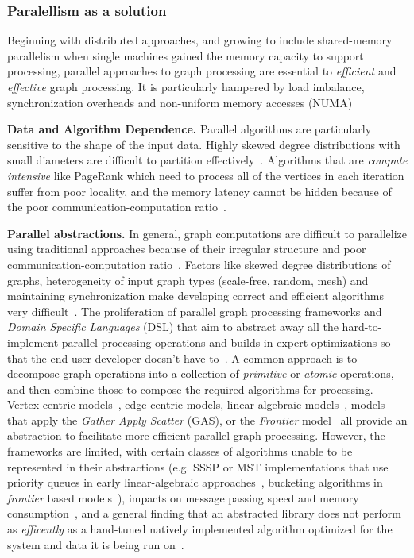 \subsubsection{Paralellism as a solution}
Beginning with distributed approaches, and growing to include shared-memory parallelism when single machines gained the memory capacity to support processing, parallel approaches to graph processing are essential to \textit{efficient} and \textit{effective} graph processing. 
It is particularly hampered by load imbalance, synchronization overheads and non-uniform memory accesses (NUMA)~\cite{Beamer2015}

\textbf{Data and Algorithm Dependence.}
Parallel algorithms are particularly sensitive to the shape of the input data. 
Highly skewed degree distributions with small diameters are difficult to partition effectively~\cite{Beamer2015, Wu2015}.
Algorithms that are \textit{compute intensive} like PageRank which need to process all of the vertices in each iteration suffer from poor locality, and the memory latency cannot be hidden because of the poor communication-computation ratio~\cite{Ahn2015}.  

\textbf{Parallel abstractions.}
In general, graph computations are difficult to parallelize using traditional approaches because of their irregular structure and poor communication-computation ratio~\cite{Buluc2011}.
Factors like skewed degree distributions of graphs, heterogeneity of input graph types (scale-free, random, mesh) and maintaining synchronization make developing correct and efficient algorithms very difficult~\cite{Hong2012, Ediger2013}.
The proliferation of parallel graph processing frameworks and \textit{Domain Specific Languages} (DSL) that aim to abstract away all the hard-to-implement parallel processing operations and builds in expert optimizations so that the end-user-developer doesn't have to~\cite{Nguyen2013, Dhulipala2017}.
A common approach is to decompose graph operations into a collection of \textit{primitive} or \textit{atomic} operations, and then combine those to compose the required algorithms for processing. 
Vertex-centric models~\cite{Mccune2015}, edge-centric models, linear-algebraic models~\cite{Mattson2013, Kepner2016, Buluc2011, Azad2021}, models that apply the \textit{Gather Apply Scatter} (GAS), or the \textit{Frontier} model~\cite{Wang2016} all provide an abstraction to facilitate more efficient parallel graph processing. 
However, the frameworks are limited, with certain classes of algorithms unable to be represented in their abstractions (e.g. SSSP or MST implementations that use priority queues in early linear-algebraic approaches~\cite{Buluc2011}, bucketing algorithms in \textit{frontier} based models~\cite{Dhulipala2017}), impacts on message passing speed and memory consumption~\cite{Wu2015}, and a general finding that an abstracted library does not perform as \textit{efficently} as a hand-tuned natively implemented algorithm optimized for the system and data it is being run on~\cite{Satish2014}.

